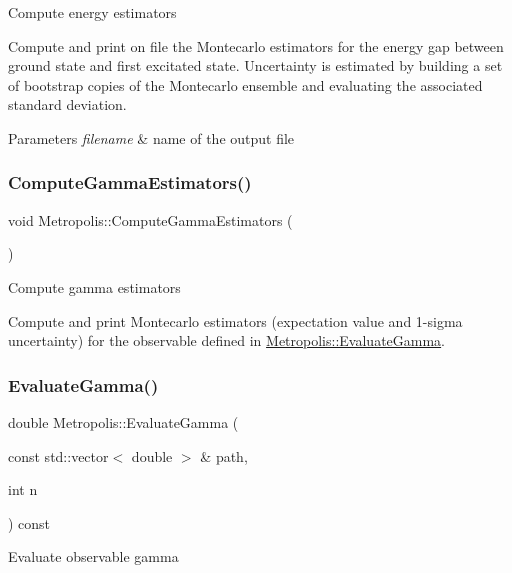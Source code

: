 Compute energy estimators

Compute and print on file the Montecarlo estimators for the energy gap between ground state and first excitated state. Uncertainty is estimated by building a set of bootstrap copies of the Montecarlo ensemble and evaluating the associated standard deviation. 
\begin{DoxyParams}{Parameters}
{\em filename} & name of the output file \\
\hline
\end{DoxyParams}
\mbox{\label{classMetropolis_aa8fc09048815c71e0a94f314afd631cc}} 
\subsubsection{\texorpdfstring{Compute\+Gamma\+Estimators()}{ComputeGammaEstimators()}}
{\footnotesize\ttfamily void Metropolis\+::\+Compute\+Gamma\+Estimators (\begin{DoxyParamCaption}{ }\end{DoxyParamCaption})}

Compute gamma estimators

Compute and print Montecarlo estimators (expectation value and 1-\/sigma uncertainty) for the observable defined in \hyperlink{classMetropolis_adf0ef3e12d4ce4185d3a536649de5cee}{Metropolis\+::\+Evaluate\+Gamma}. \mbox{\label{classMetropolis_adf0ef3e12d4ce4185d3a536649de5cee}} 
\subsubsection{\texorpdfstring{Evaluate\+Gamma()}{EvaluateGamma()}}
{\footnotesize\ttfamily double Metropolis\+::\+Evaluate\+Gamma (\begin{DoxyParamCaption}\item[{const std\+::vector$<$ double $>$ \&}]{path,  }\item[{int}]{n }\end{DoxyParamCaption}) const}

Evaluate observable gamma


